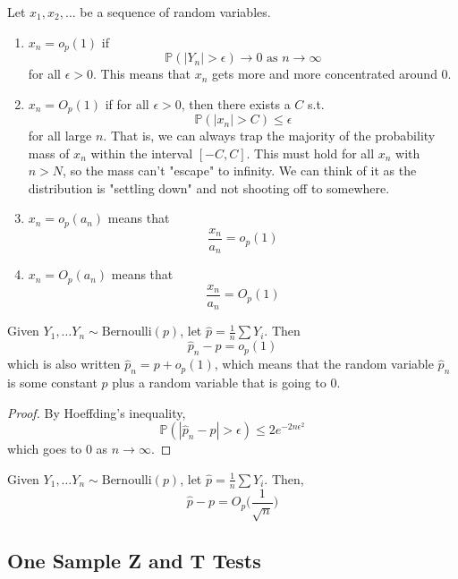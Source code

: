   \begin{definition}[$O_p, o_p$ Notation]
  Let $x_1, x_2, \ldots $ be a sequence of random variables. 
  \begin{enumerate}
      \item $x_n = o_p (1)$ if 
      \[\mathbb{P}(|Y_n| > \epsilon) \rightarrow 0 \text{ as } n \rightarrow \infty\]
      for all $\epsilon > 0$. This means that $x_n$ gets more and more concentrated around $0$. 

      \item $x_n = O_p(1)$ if for all $\epsilon > 0$, then there exists a $C$ s.t. 
      \[\mathbb{P}(|x_n| > C) \leq \epsilon\]
      for all large $n$. That is, we can always trap the majority of the probability mass of $x_n$ within the interval $[-C, C]$. This must hold for all $x_n$ with $n > N$, so the mass can't "escape" to infinity. We can think of it as the distribution is "settling down" and not shooting off to somewhere. 

      \item $x_n = o_p (a_n)$ means that 
      \[\frac{x_n}{a_n} = o_p (1)\]

      \item $x_n = O_p (a_n)$ means that 
      \[\frac{x_n}{a_n} = O_p(1)\]
  \end{enumerate}
  \end{definition}

  \begin{theorem}
  Given $Y_1, \ldots Y_n \sim \mathrm{Bernoulli}(p)$, let $\widehat{p} = \frac{1}{n} \sum Y_i$. Then 
  \[\widehat{p}_n - p = o_p (1)\]
  which is also written $\widehat{p}_n = p + o_p (1)$, which means that the random variable $\widehat{p}_n$ is some constant $p$ plus a random variable that is going to $0$. 
  \end{theorem}
  \begin{proof}
  By Hoeffding's inequality, 
  \[\mathbb{P}(| \widehat{p}_n - p | > \epsilon) \leq 2 e^{-2n \epsilon^2}\]
  which goes to $0$ as $n \rightarrow \infty$. 
  \end{proof}

  \begin{example}
  Given $Y_1, \ldots Y_n \sim \mathrm{Bernoulli}(p)$, let $\widehat{p} = \frac{1}{n} \sum Y_i$. Then, 
  \[\widehat{p} - p = O_p \Big( \frac{1}{\sqrt{n}} \Big)\]
  \end{example}

\subsection{One Sample Z and T Tests}

